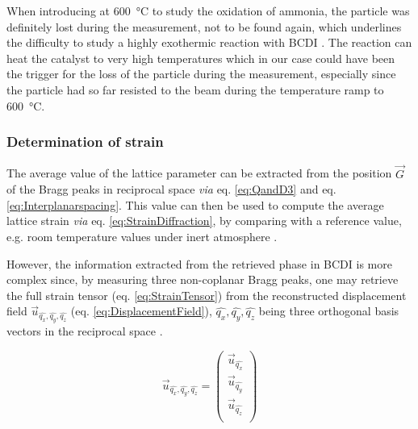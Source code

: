 When introducing  at \qty{600}{\degreeCelsius} to study the oxidation of ammonia, the particle was definitely lost during the measurement, not to be found again, which underlines the difficulty to study a highly exothermic reaction with BCDI \parencite{PerezRamirez2004, Hatscher2008}.
The reaction can heat the catalyst to very high temperatures which in our case could have been the trigger for the loss of the particle during the measurement, especially since the particle had so far resisted to the beam during the temperature ramp to \qty{600}{\degreeCelsius}.

\subsubsection{Determination of strain}

The average value of the lattice parameter can be extracted from the position $\vec{G}$ of the Bragg peaks in reciprocal space \textit{via} eq. \ref{eq:QandD3} and eq. \ref{eq:Interplanarspacing}.
This value can then be used to compute the average lattice strain \textit{via} eq. \ref{eq:StrainDiffraction}, by comparing with a reference value, e.g. room temperature values under inert atmosphere \parencite{Fernandez2019}.

However, the information extracted from the retrieved phase in BCDI is more complex since, by measuring three non-coplanar Bragg peaks, one may retrieve the full strain tensor (eq. \ref{eq:StrainTensor}) from the reconstructed displacement field $\vec{u}_{\hat{q_x}, \hat{q_y}, \hat{q_z}}$ (eq. \ref{eq:DisplacementField}), $\hat{q_x}, \hat{q_y}, \hat{q_z}$ being three orthogonal basis vectors in the reciprocal space \parencite{Karpov2019}.

\begin{equation}
    \vec{u}_{\hat{q_x}, \hat{q_y}, \hat{q_z}} =
     \begin{pmatrix}
        \vec{u}_{\hat{q_x}} \\
        \vec{u}_{\hat{q_y}} \\
        \vec{u}_{\hat{q_z}} \\
     \end{pmatrix}
     \label{eq:DisplacementField}
\end{equation}

